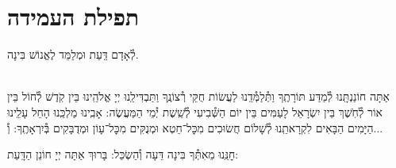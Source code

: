 \documentclass[twoside, openany, parskip=half, 11pt]{book}
\begin{document}
\section*{ תפילת העמידה }


\amidaopening{\ayt}{}

לְ֯אָדָם דַּֽעַת וּמְלַמֵּד לֶאֱנוֹשׁ בִּינָה.

\begin{sometimes}

\\
אַתָּה חוֹנַנְתָּֽנוּ לְ֯מַדַּע תּוֹרָתֶֽךָ וַתְּ֯לַמְּ֯דֵֽנוּ לַעֲשׂוֹת חֻקֵּי רְ֯צוֹנֶֽךָ וַתַּבְדִּילֵֽנוּ יְיָ אֱלֹהֵֽינוּ בֵּין קֹֽדֶשׁ לְ֯חוֹל בֵּין אוֹר לְ֯חֹֽשֶׁךְ בֵּין יִשְׂרָאֵל לָעַמִּים בֵּין יוֹם הַשְּׁ֯בִיעִי לְ֯שֵֽׁשֶׁת יְ֯מֵי הַמַּעֲשֶׂה: אָבִֽינוּ מַלְכֵּֽנוּ הָחֵל עָלֵֽינוּ הַיָּמִים הַבָּאִים לִקְרָאתֵֽנוּ לְ֯שָׁלוֹם חֲשׂוּכִים מִכׇּל־חֵטְא וּמְנֻקִּים מִכׇּל־עָוֹן וּמְדֻבָּקִים בְּ֯יִרְאָתֶֽךָ: וְ֯...

\end{sometimes}

חׇנֵּֽנוּ מֵאִתְּ֯ךָ בִּינָה דֵּעָה וְ֯הַשְׂכֵּל: בָּרוּךְ אַתָּה יְיָ חוֹנֵן הַדָּֽעַת:

\weekdaysateshuva

\weekdaysaselichah

\weekdaysageulah

\weekdaysarefuah

\weekdaysaberacha

\weekdaysashofar

\weekdaysamishpat

\weekdaysaminim

\weekdaysatzadikim

\weekdaysayerushelayim

\weekdaysamalchus

\weekdaysashemakoleinu

\retzeh

\yaalehveyavo

\zion

\newcommand{\maarivmodim}{
\firstword{מוֹדִים}
אֲנַֽחְנוּ לָךְ שָׁאַתָּה הוּא יְיָ אֱלֹהֵֽינוּ וֵאלֹהֵי אֲבוֹתֵֽינוּ לְ֯עוֹלָם וָעֶד צוּר חַיֵּֽינוּ מָגֵן יִשְׁעֵֽנוּ אַתָּה הוּא לְ֯דוֹר וָדוֹר: נוֹדֶה לְּ֯ךָ וּנְסַפֵּר תְּ֯הִלָּתֶֽךָ עַל חַיֵּֽינוּ הַמְּ֯סוּרִים בְּ֯יָדֶֽךָ וְ֯עַל נִשְׁמוֹתֵֽינוּ הַפְּ֯קוּדוֹת לָךְ וְ֯עַל נִסֶּֽיךָ שֶׁבְּ֯כׇל־יוֹם עִמָּֽנוּ וְ֯עַל נִפְלְ֯אוֹתֶֽיךָ וְ֯טוֹבוֹתֶֽיךָ שֶׁבְּ֯כׇל־עֵת עֶֽרֶב וָבֹֽקֶר וְ֯צׇהֳרָֽיִם: הַטּוֹב כִּי לֹא כָלוּ רַחֲמֶֽיךָ וְ֯הַמְ֯רַחֵם כִּי לֹא תַֽמּוּ חֲסָדֶֽיךָ מֵעוֹלָם קִוִֽינוּ לָךְ:
}
\end{document}
